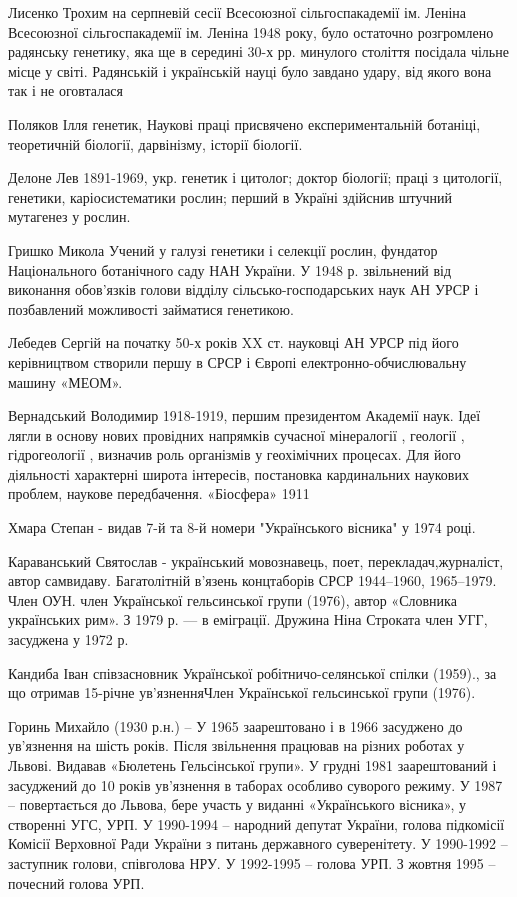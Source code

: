 Лисенко Трохим на серпневій сесії Всесоюзної сільгоспакадемії ім. Леніна Всесоюзної сільгоспакадемії ім. Леніна 1948 року, було остаточно розгромлено радянську генетику, яка ще в середині 30-х рр. минулого століття посідала чільне місце у світі. Радянській і українській науці було завдано удару, від якого вона так і не оговталася

Поляков Ілля генетик, Наукові праці присвячено експериментальній ботаніці, теоретичній біології, дарвінізму, історії біології.

Делоне Лев 1891-1969, укр. генетик і цитолог; доктор біології; праці з цитології, генетики, каріосистематики рослин; перший в Україні здійснив штучний мутагенез у рослин.

Гришко Микола Учений у галузі генетики і селекції рослин, фундатор Національного ботанічного саду НАН України. У 1948 р. звільнений від виконання обов'язків голови відділу сільсько-господарських наук АН УРСР і позбавлений можливості займатися генетикою.

Лебедев Сергій на початку 50-х років XX ст. науковці АН УРСР під його керівництвом створили першу в СРСР і Європі електронно-обчислювальну машину «МЕОМ».

Вернадський Володимир 1918-1919, першим президентом Академії наук. Ідеї лягли в основу нових провідних напрямків сучасної мінералогії , геології , гідрогеології , визначив роль організмів у геохімічних процесах. Для його діяльності характерні широта інтересів, постановка кардинальних наукових проблем, наукове передбачення. «Біосфера» 1911

Хмара Степан  - видав 7-й та 8-й номери "Українського вісника" у 1974 році.

Караванський Святослав - український мовознавець, поет, перекладач,журналіст, автор самвидаву. Багатолітній в'язень концтаборів СРСР 1944–1960, 1965–1979. Член ОУН. член Української гельсинської групи (1976), автор «Словника українських рим». З 1979 р. — в еміграції. Дружина Ніна Строката член УГГ, засуджена у 1972 р.

Кандиба Іван співзасновник Української робітничо-селянської спілки (1959)., за що отримав 15-річне ув’язненняЧлен Української гельсинської групи (1976).

Горинь Михайло (1930 р.н.) – У 1965 заарештовано і в 1966 засуджено до ув'язнення на шість років. Після звільнення працював на різних роботах у Львові. Видавав «Бюлетень Гельсінської групи». У грудні 1981 заарештований і засуджений до 10 років ув'язнення в таборах особливо суворого режиму. У 1987 – повертається до Львова, бере участь у виданні «Українського вісника», у створенні УГС, УРП. У 1990-1994 – народний депутат України, голова підкомісії Комісії Верховної Ради України з питань державного суверенітету. У 1990-1992 – заступник голови, співголова НРУ. У 1992-1995 – голова УРП. З жовтня 1995 – почесний голова УРП.


